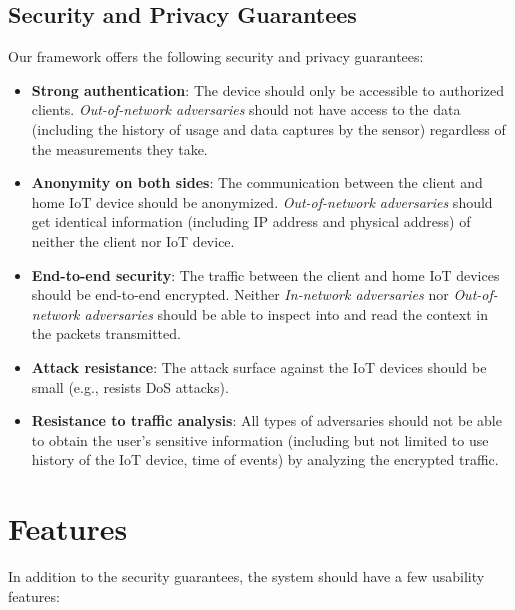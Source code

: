 \subsection{Security and Privacy Guarantees}

Our framework offers the following security and privacy guarantees:

\begin{itemize}
	\item \textbf{Strong authentication}: The device should only be accessible to authorized clients. \textit{Out-of-network adversaries} should not have access to the data (including the history of usage and data captures by the sensor) regardless of the measurements they take.
	\item \textbf{Anonymity on both sides}: The communication between the client and home IoT device should be anonymized. \textit{Out-of-network adversaries} should  get identical information (including IP address and physical address) of neither the client nor IoT device.
	\item \textbf{End-to-end security}: The traffic between the client and home IoT devices should be end-to-end encrypted. Neither \textit{In-network adversaries} nor \textit{Out-of-network adversaries} should be able to inspect into and read the context in the packets transmitted.
	\item \textbf{Attack resistance}: The attack surface against the IoT devices should be small (e.g., resists DoS attacks).
	\item \textbf{Resistance to traffic analysis}: All types of adversaries should not be able to obtain the user's sensitive information (including but not limited to use history of the IoT device, time of events) by analyzing the encrypted traffic.
\end{itemize}

\section{Features}
In addition to the security guarantees, the system should have a few usability features:

